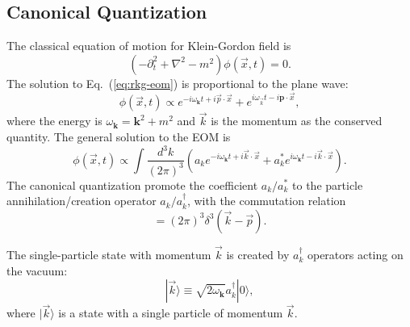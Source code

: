 \subsection{Canonical Quantization}
The classical equation of motion for Klein-Gordon field is 
\begin{equation}
	(-\partial_t^2+\nabla^2-m^2)\phi(\vec x,t) = 0. 
	\label{eq:rkg-eom}
\end{equation}
The solution to Eq.~(\ref{eq:rkg-eom}) is proportional to the plane wave:
\begin{equation*}
	\phi(\vec x, t) \propto e^{-i\omega_{\bm{k}}t+i\vec{p}\cdot\vec{x}} + e^{i\omega_{\vec{k}}t-i\bm{p}\cdot\vec{x}},
\end{equation*}
where the energy is $\omega_{\bm{k}}=\bm{k}^2+m^2$ and $\vec k$ is the momentum as the conserved quantity.
The general solution to the EOM is
\begin{equation}
	\phi(\vec x,t) \propto \int \frac{d^{3} k}{(2\pi)^{3}} \left(
		a_{k}e^{-i\omega_{\bm{k}}t+i\vec{k}\cdot\vec{x}} + 
		a^*_{k}e^{i\omega_{\bm{k}}t-i\vec{k}\cdot\vec{x}} 
	\right).
\end{equation}
The canonical quantization promote the coefficient $a_{k}/a_{k}^*$ to the particle annihilation/creation operator $a_{k}/a_{k}^\dagger$, with the commutation relation
\begin{equation}
	[a_{k}, a_{p}^\dagger] = (2\pi)^{3} \delta^{3}(\vec{k}-\vec{p}).
\end{equation}

The single-particle state with momentum $\vec k$ is created by $a_{k}^{\dagger}$ operators acting on the vacuum:
\begin{equation}
	|\vec{k}\rangle \equiv \sqrt{2\omega_{\bm k}} a_{k}^{\dagger}|0\rangle,
	\label{eq:rel-single-particle}
\end{equation}
where $|\vec{k}\rangle$ is a state with a single particle of momentum $\vec{k}$.

